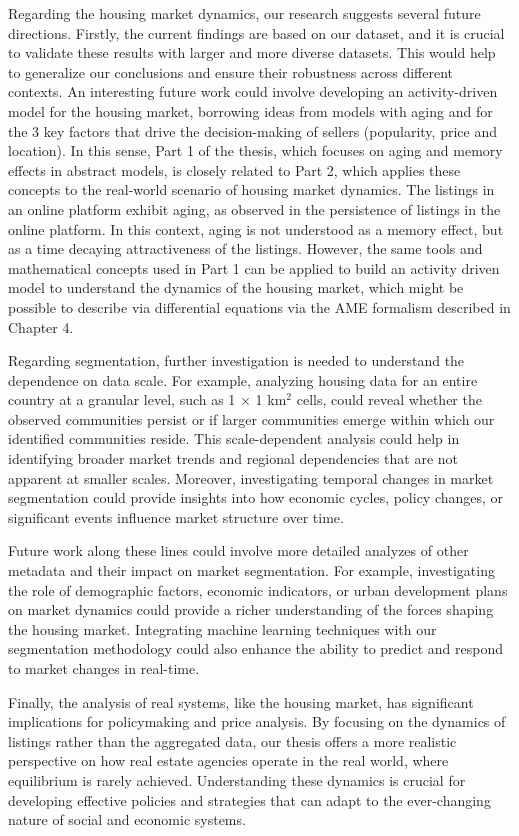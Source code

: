 Regarding the housing market dynamics, our research suggests several future directions. Firstly, the current findings are based on our dataset, and it is crucial to validate these results with larger and more diverse datasets. This would help to generalize our conclusions and ensure their robustness across different contexts. An interesting future work could involve developing an activity-driven model for the housing market, borrowing ideas from models with aging and for the 3 key factors that drive the decision-making of sellers (popularity, price and location). In this sense, Part 1 of the thesis, which focuses on aging and memory effects in abstract models, is closely related to Part 2, which applies these concepts to the real-world scenario of housing market dynamics. The listings in an online platform exhibit aging, as observed in the persistence of listings in the online platform. In this context, aging is not understood as a memory effect, but as a time decaying attractiveness of the listings. However, the same tools and mathematical concepts used in Part 1 can be applied to build an activity driven model to understand the dynamics of the housing market, which might be possible to describe via differential equations via the AME formalism described in Chapter 4.

Regarding segmentation, further investigation is needed to understand the dependence on data scale. For example, analyzing housing data for an entire country at a granular level, such as 1 $\times$ 1 km$^2$ cells, could reveal whether the observed communities persist or if larger communities emerge within which our identified communities reside. This scale-dependent analysis could help in identifying broader market trends and regional dependencies that are not apparent at smaller scales. Moreover, investigating temporal changes in market segmentation could provide insights into how economic cycles, policy changes, or significant events influence market structure over time.

Future work along these lines could involve more detailed analyzes of other metadata and their impact on market segmentation. For example, investigating the role of demographic factors, economic indicators, or urban development plans on market dynamics could provide a richer understanding of the forces shaping the housing market. Integrating machine learning techniques with our segmentation methodology could also enhance the ability to predict and respond to market changes in real-time.

Finally, the analysis of real systems, like the housing market, has significant implications for policymaking and price analysis. By focusing on the dynamics of listings rather than the aggregated data, our thesis offers a more realistic perspective on how real estate agencies operate in the real world, where equilibrium is rarely achieved. Understanding these dynamics is crucial for developing effective policies and strategies that can adapt to the ever-changing nature of social and economic systems.


